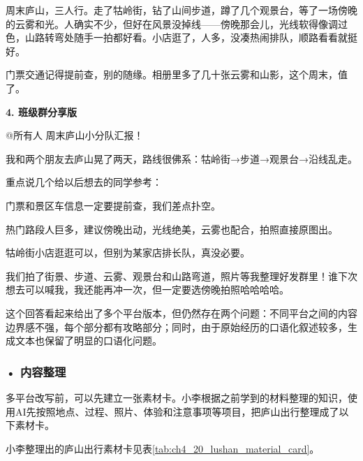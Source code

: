 \begin{aibox}
\par\qquad 周末庐山，三人行。走了牯岭街，钻了山间步道，蹲了几个观景台，等了一场傍晚的云雾和光。人确实不少，但好在风景没掉线——傍晚那会儿，光线软得像调过色，山路转弯处随手一拍都好看。小店逛了，人多，没凑热闹排队，顺路看看就挺好。

\par\qquad 门票交通记得提前查，别的随缘。相册里多了几十张云雾和山影，这个周末，值了。

\textbf{4. 班级群分享版}

@所有人 周末庐山小分队汇报！

我和两个朋友去庐山晃了两天，路线很佛系：牯岭街→步道→观景台→沿线乱走。

重点说几个给以后想去的同学参考：

门票和景区车信息一定要提前查，我们差点扑空。

热门路段人巨多，建议傍晚出动，光线绝美，云雾也配合，拍照直接原图出。

牯岭街小店逛逛可以，但别为某家店排长队，真没必要。

我们拍了街景、步道、云雾、观景台和山路弯道，照片等我整理好发群里！谁下次想去可以喊我，我还能再冲一次，但一定要选傍晚拍照哈哈哈哈。
\end{aibox}

这个回答看起来给出了多个平台版本，但仍然存在两个问题：不同平台之间的内容边界感不强，每个部分都有攻略部分；同时，由于原始经历的口语化叙述较多，生成文本也保留了明显的口语化问题。

\subsubsection*{\textbf{• 内容整理}}

多平台改写前，可以先建立一张素材卡。小李根据之前学到的材料整理的知识，使用AI先按照地点、过程、照片、体验和注意事项等项目，把庐山出行整理成了以下素材卡。


小李整理出的庐山出行素材卡见表\ref{tab:ch4_20_lushan_material_card}。

